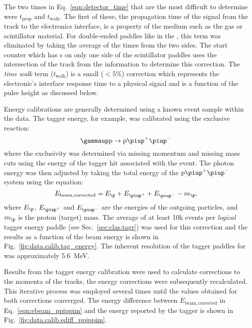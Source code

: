 The two times in Eq.~\ref{eqn:detector_time} that are the most difficult to determine were $t_\mathrm{prop}$ and $t_\mathrm{walk}$. The first of these, the propagation time of the signal from the track to the electronics interface, is a property of the medium such as the gas or scintillator material. For double-ended paddles like in the , this term was eliminated by taking the average of the  times from the two sides. The start counter which has s on only one side of the scintillator paddles uses the intersection of the track from the  information to determine this correction. The \emph{time walk} term ($t_\mathrm{walk}$) is a small ($<5\%$) correction which represents the electronic's interface response time to a physical signal and is a function of the  pulse height as discussed below.

Energy calibrations are generally determined using a known event sample within the data. The tagger energy, for example, was calibrated using the exclusive reaction:
\begin{equation}
    \mathrm{\gammaup p \rightarrow p \piup^+ \piup^-}\label{rxn:excl_ppippim}
\end{equation}
where the exclusivity was determined via missing momentum and missing mass cuts using the energy of the tagger hit associated with the event. The photon energy was then adjusted by taking the total energy of the $\mathrm{p \piup^+ \piup^-}$ system using the equation:
\begin{equation}
    E_\mathrm{beam, corrected} = E_\p + E_{\mathrm{\piup^+}} + E_{\mathrm{\piup^-}} - m_\p,
    \label{eqn:ebeam_ppippim}
\end{equation}
where $E_\p$, $E_{\mathrm{\piup^+}}$ and $E_{\mathrm{\piup^-}}$ are the energies of the outgoing particles, and $m_\p$ is the proton (target) mass. The average of at least 10k events per \emph{logical} tagger energy paddle (see Sec.~\ref{sec:clas.tagr}) was used for this correction and the results as a function of the beam energy is shown in Fig.~\ref{fig:data.calib.tag_energy}. The inherent resolution of the tagger paddles for  was approximately 5.6~MeV.

Results from the tagger energy calibration were used to calculate corrections to the momenta of the tracks, the energy corrections were subsequently recalculated. This iterative process was employed several times until the values obtained for both corrections converged. The energy difference between $E_\mathrm{beam, corrected}$ in Eq.~\ref{eqn:ebeam_ppippim} and the energy reported by the tagger is shown in Fig.~\ref{fig:data.calib.ediff_ppippim}.

